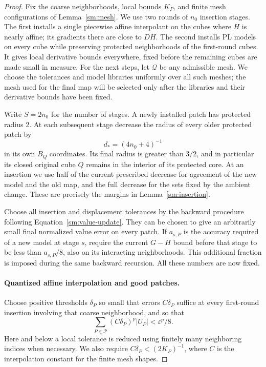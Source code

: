 \documentclass[11pt]{article}
\numberwithin{equation}{section}
\theoremstyle{definition}
\theoremstyle{remark}
\newcommand{\eps}{\varepsilon}
\begin{document}
\begin{proof}
Fix the coarse neighborhoods, local bounds $K_P$, and finite
mesh configurations of Lemma~\ref{sm:mesh}.  We use two rounds of
$n_0$ insertion stages.  The first installs a single piecewise
affine interpolant on the cubes where $H$ is nearly affine; its
gradients there are close to $DH$.  The second installs PL models
on every cube while preserving protected neighborhoods of the
first-round cubes.  It gives
local derivative bounds everywhere, fixed before the remaining
cubes are made small in measure.  For the next steps, let
$\mathcal Q$ be any admissible mesh.  We choose the tolerances
and model libraries uniformly over all such meshes; the mesh
used for the final map will be selected only after the libraries
and their derivative bounds have been fixed.

Write $S=2n_0$ for the number of stages.  A newly installed patch
has protected radius 2.  At each subsequent stage decrease
the radius of every older protected patch by
\begin{equation}
 \label{sm:shrink-size}
 d_*=(4n_0+4)^{-1}
\end{equation}
in its own $B_Q$ coordinates.  Its final radius is greater
than $3/2$, and in particular its closed original cube $Q$
remains in the interior of its protected core.  At an
insertion we use half of the current prescribed decrease
for agreement of the new model and the old map, and the
full decrease for the sets fixed by the ambient change.
These are precisely the margins in
Lemma~\ref{sm:insertion}.

Choose all insertion and displacement tolerances by the
backward procedure following Equation~\eqref{sm:value-update}.
They can be chosen to give an arbitrarily small final
normalized value error on every patch.  If $a_{s,P}$ is
the accuracy required of a new model at stage $s$, require
the current $G-H$ bound before that stage to be less than
$a_{s,P}/8$, also on its interacting neighborhoods.  This
additional fraction is imposed during the same backward
recursion.  All these numbers are now fixed.

\paragraph{Quantized affine interpolation and good patches.}
Choose positive thresholds $\delta_P$ so small that errors
$C\delta_P$ suffice at every first-round insertion involving
that coarse neighborhood, and so that
\begin{equation}
 \label{sm:good-error-budget}
 \sum_{P\in\mathcal P}(C\delta_P)^p |U_P|<\eps^p/8.
\end{equation}
Here and below a local tolerance is reduced using finitely many
neighboring indices when necessary.  We also require
$C\delta_P<(2K_P)^{-1}$, where $C$ is the interpolation
constant for the finite mesh shapes.


\end{proof}
\end{document}
